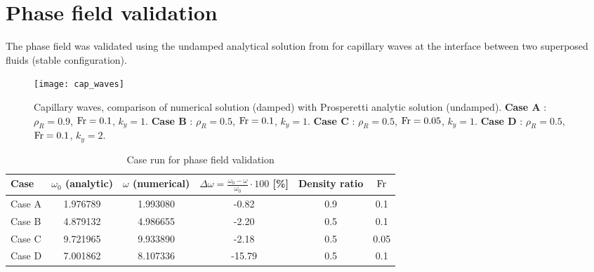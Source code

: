 \newpage
\section{Phase field validation}
The phase field was validated using the undamped analytical solution from \cite{Prosperetti81} for capillary waves at the interface between two superposed fluids (stable configuration). 
\begin{figure}[H]
\centering
\texttt{[image: cap\_waves]}
\caption{Capillary waves, comparison of numerical solution (damped) with Prosperetti analytic solution (undamped). \textbf{Case A} : $\rho_R=0.9$, $\textnormal{Fr}=0.1$, $k_y=1$. \textbf{Case B} : $\rho_R=0.5$, $\textnormal{Fr}=0.1$, $k_y=1$. \textbf{Case C} : $\rho_R=0.5$, $\textnormal{Fr}=0.05$, $k_y=1$. \textbf{Case D} : $\rho_R=0.5$, $\textnormal{Fr}=0.1$, $k_y=2$.}
\end{figure}

\begin{table}[H]
\centering
\caption{Case run for phase field validation}
\begin{tabular}{l|c|c|c|c|c}
Case  & $\omega_0$ (analytic) & $\omega$ (numerical) & $\Delta \omega=\frac{\omega_0-\omega}{\omega_0}\cdot100$ [\%] & Density ratio & $\textnormal{Fr}$ \\[0.5ex]
\hline
Case A &1.976789 & 1.993080& -0.82  &0.9&0.1\\[0.5ex]
Case B &4.879132 &4.986655  & -2.20&0.5&0.1\\[0.5ex]
Case C & 9.721965& 9.933890&   -2.18&0.5&0.05\\[0.5ex]
Case D &7.001862 & 8.107336 &-15.79 &0.5& 0.1\\[0.5ex]
\end{tabular}
\end{table}



